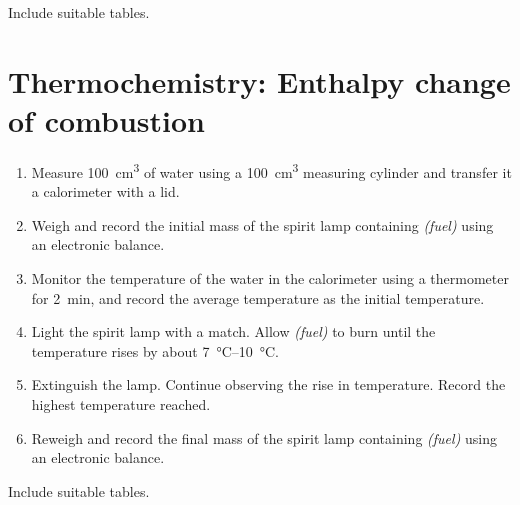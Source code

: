 Include suitable tables.

\section{Thermochemistry: Enthalpy change of combustion}
\begin{enumerate}

\item
  Measure \SI{100}{\centi\metre\cubed} of water using a \SI{100}{\centi\metre\cubed} measuring cylinder and transfer it a calorimeter
  with a lid.
\item
  Weigh and record the initial mass of the spirit lamp containing
  \emph{(fuel)} using an electronic balance.
\item
  Monitor the temperature of the water in the calorimeter using a
  thermometer for \SI{2}{\minute}, and record the average temperature as the
  initial temperature.
\item
  Light the spirit lamp with a match. Allow \emph{(fuel)} to burn
  until the temperature rises by about \SIrange{7}{10}{\celsius}.
\item
  Extinguish the lamp. Continue observing the rise in temperature.
  Record the highest temperature reached.
\item
  Reweigh and record the final mass of the spirit lamp containing
  \emph{(fuel)} using an electronic balance.
\end{enumerate}

Include suitable tables.
